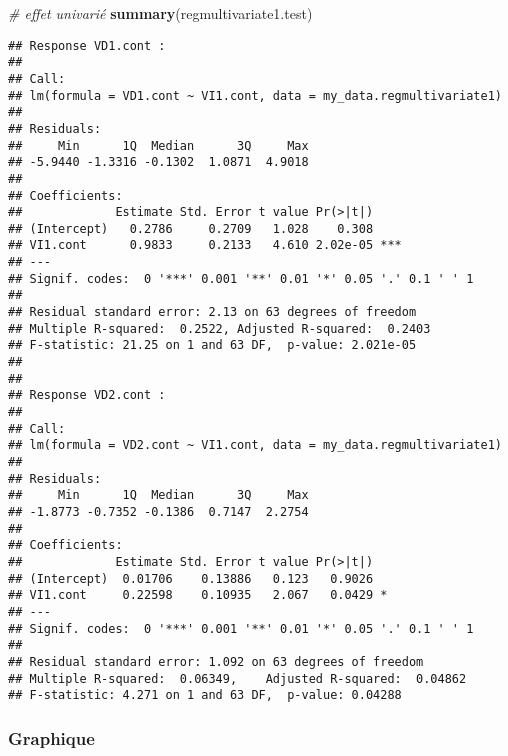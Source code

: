 \documentclass[
]{book}
\newenvironment{Shaded}{\begin{snugshade}}{\end{snugshade}}
\newcommand{\CommentTok}[1]{\textcolor[rgb]{0.56,0.35,0.01}{\textit{#1}}}
\newcommand{\KeywordTok}[1]{\textcolor[rgb]{0.13,0.29,0.53}{\textbf{#1}}}
\newcommand{\NormalTok}[1]{#1}
\begin{document}
\begin{Shaded}
\begin{Highlighting}[]
\CommentTok{# effet univarié}
\KeywordTok{summary}\NormalTok{(regmultivariate1.test)}
\end{Highlighting}
\end{Shaded}

\begin{verbatim}
## Response VD1.cont :
## 
## Call:
## lm(formula = VD1.cont ~ VI1.cont, data = my_data.regmultivariate1)
## 
## Residuals:
##     Min      1Q  Median      3Q     Max 
## -5.9440 -1.3316 -0.1302  1.0871  4.9018 
## 
## Coefficients:
##             Estimate Std. Error t value Pr(>|t|)    
## (Intercept)   0.2786     0.2709   1.028    0.308    
## VI1.cont      0.9833     0.2133   4.610 2.02e-05 ***
## ---
## Signif. codes:  0 '***' 0.001 '**' 0.01 '*' 0.05 '.' 0.1 ' ' 1
## 
## Residual standard error: 2.13 on 63 degrees of freedom
## Multiple R-squared:  0.2522,	Adjusted R-squared:  0.2403 
## F-statistic: 21.25 on 1 and 63 DF,  p-value: 2.021e-05
## 
## 
## Response VD2.cont :
## 
## Call:
## lm(formula = VD2.cont ~ VI1.cont, data = my_data.regmultivariate1)
## 
## Residuals:
##     Min      1Q  Median      3Q     Max 
## -1.8773 -0.7352 -0.1386  0.7147  2.2754 
## 
## Coefficients:
##             Estimate Std. Error t value Pr(>|t|)  
## (Intercept)  0.01706    0.13886   0.123   0.9026  
## VI1.cont     0.22598    0.10935   2.067   0.0429 *
## ---
## Signif. codes:  0 '***' 0.001 '**' 0.01 '*' 0.05 '.' 0.1 ' ' 1
## 
## Residual standard error: 1.092 on 63 degrees of freedom
## Multiple R-squared:  0.06349,	Adjusted R-squared:  0.04862 
## F-statistic: 4.271 on 1 and 63 DF,  p-value: 0.04288
\end{verbatim}

\hypertarget{graphique-21}{%
\subsubsection{Graphique}\label{graphique-21}}
\end{document}
